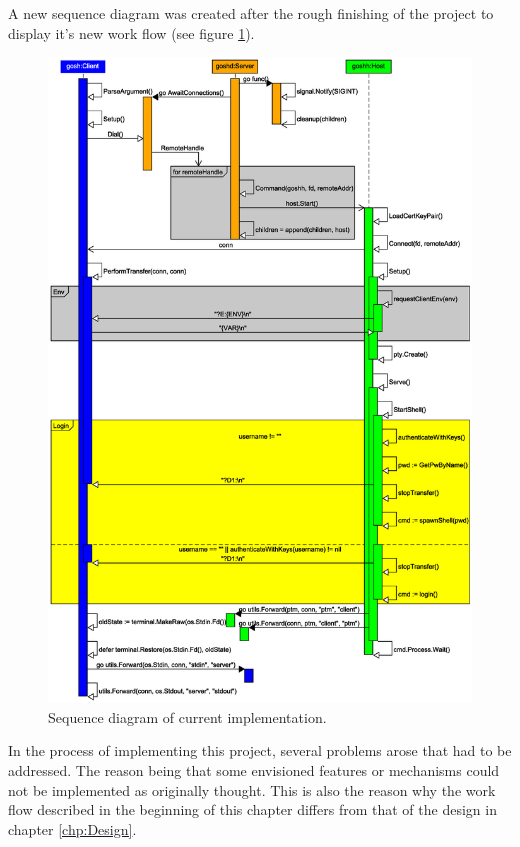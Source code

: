 \documentclass[10pt,a4paper,titlepage,twoside,english,final]{zhawreprt}
\begin{document}
A new sequence diagram was created after the rough finishing of the project to display it's new work flow (see figure \ref{fig:SeqDiaCurrent}).

\begin{figure}[ht]
\includegraphics[width=\textwidth]{SequenceDiagramNew}
\caption{Sequence diagram of current implementation.}
\label{fig:SeqDiaCurrent}
\end{figure}

In the process of implementing this project, several problems arose that had to be addressed.
The reason being that some envisioned features or mechanisms could not be implemented as originally thought.
This is also the reason why the work flow described in the beginning of this chapter differs from that of the design in chapter \ref{chp:Design}.
\end{document}

